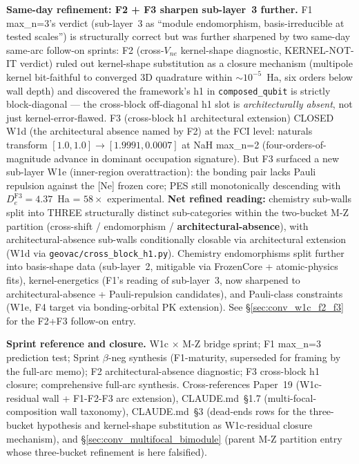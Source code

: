 \documentclass[11pt]{article}
\begin{document}
\textbf{Same-day refinement: F2 + F3 sharpen sub-layer~3 further.}
F1 max\_n=3's verdict (sub-layer~3 as ``module endomorphism, basis-irreducible
at tested scales'') is structurally correct but was further sharpened by
two same-day same-arc follow-on sprints: F2 (cross-$V_{ne}$ kernel-shape
diagnostic, KERNEL-NOT-IT verdict) ruled out kernel-shape substitution as
a closure mechanism (multipole kernel bit-faithful to converged 3D
quadrature within $\sim 10^{-5}$~Ha, six orders below wall depth) and
discovered the framework's h1 in \texttt{composed\_qubit} is strictly
block-diagonal --- the cross-block off-diagonal h1 slot is
\emph{architecturally absent}, not just kernel-error-flawed. F3
(cross-block h1 architectural extension) CLOSED W1d (the architectural
absence named by F2) at the FCI level: naturals transform $[1.0, 1.0] \to
[1.9991, 0.0007]$ at NaH max\_n=2 (four-orders-of-magnitude advance in
dominant occupation signature). But F3 surfaced a new sub-layer W1e
(inner-region overattraction): the bonding pair lacks Pauli repulsion
against the [Ne] frozen core; PES still monotonically descending with
$D_e^\text{F3} = 4.37$~Ha = $58\times$ experimental. \textbf{Net refined
reading:} chemistry sub-walls split into THREE structurally distinct
sub-categories within the two-bucket M-Z partition (cross-shift /
endomorphism / \textbf{architectural-absence}), with architectural-absence
sub-walls conditionally closable via architectural extension (W1d via
\texttt{geovac/cross\_block\_h1.py}). Chemistry endomorphisms split
further into basis-shape data (sub-layer~2, mitigable via FrozenCore +
atomic-physics fits), kernel-energetics (F1's reading of sub-layer~3, now
sharpened to architectural-absence + Pauli-repulsion candidates), and
Pauli-class constraints (W1e, F4 target via bonding-orbital PK extension).
See \S\ref{sec:conv_w1c_f2_f3} for the F2+F3 follow-on entry.

\textbf{Sprint reference and closure.} W1c $\times$ M-Z bridge sprint; F1
max\_n=3 prediction test; Sprint
$\beta$-neg synthesis (F1-maturity, superseded for framing by the
full-arc memo); F2
architectural-absence diagnostic; F3 cross-block
h1 closure; comprehensive
full-arc synthesis. Cross-references
Paper~19 (W1c-residual wall + F1-F2-F3 arc
extension), CLAUDE.md~\S1.7 (multi-focal-composition wall taxonomy),
CLAUDE.md~\S3 (dead-ends rows for the three-bucket hypothesis and
kernel-shape substitution as W1c-residual closure mechanism), and
\S\ref{sec:conv_multifocal_bimodule} (parent M-Z partition entry whose
three-bucket refinement is here falsified).
\end{document}
